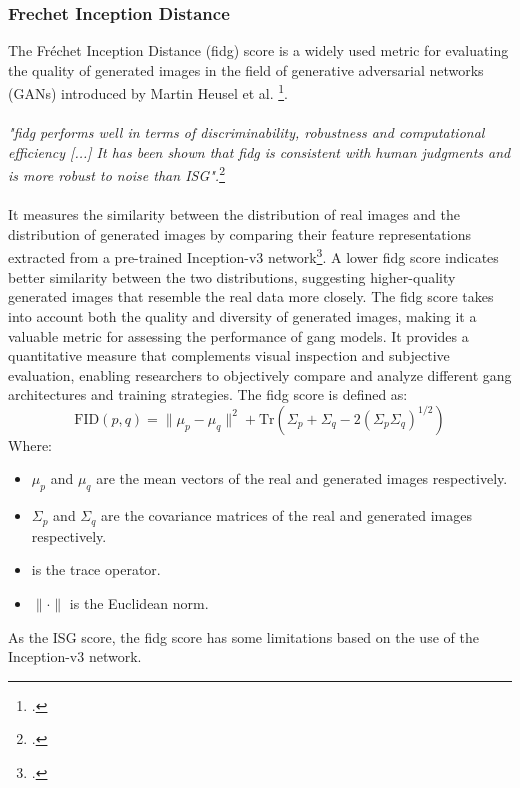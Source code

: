 \subsubsection{Frechet Inception Distance}
\label{subsubsec:frechet-inception-distance}
The Fréchet Inception Distance (\gls{fidg}\glsfirstoccur) score is a widely used metric for evaluating the quality of generated images in the field of generative adversarial networks (GANs) introduced by Martin Heusel et al. \footcite{paper:heusel2017gans}. 
\\\\
\emph{"\gls{fidg} performs well in terms of discriminability, robustness and computational efficiency [...] It has been shown that \gls{fidg} is consistent with human judgments and is more robust to noise than \gls{ISG}".}\footcite{paper:ganeval}\\\\
It measures the similarity between the distribution of real images and the distribution of generated images by comparing their feature representations extracted from a pre-trained Inception-v3 network\footcite{paper:inceptionv3}. 
A lower \gls{fidg} score indicates better similarity between the two distributions, suggesting higher-quality generated images that resemble the real data more closely. 
The \gls{fidg} score takes into account both the quality and diversity of generated images, making it a valuable metric for assessing the performance of \gls{gang} models. 
It provides a quantitative measure that complements visual inspection and subjective evaluation, enabling researchers to objectively compare and analyze different \gls{gang} architectures and training strategies.
The \gls{fidg} score is defined as:
\begin{equation}
    \label{eq:fid-score}
    \text{FID}(p, q) = \|\mu_p - \mu_q\|^2 + \text{Tr}(\Sigma_p + \Sigma_q - 2(\Sigma_p\Sigma_q)^{1/2})
\end{equation}
Where:
\begin{itemize}
    \item $\mu_p$ and $\mu_q$ are the mean vectors of the real and generated images respectively.
    \item $\Sigma_p$ and $\Sigma_q$ are the covariance matrices of the real and generated images respectively.
    \item {} is the trace operator.
    \item $\|\cdot\|$ is the Euclidean norm.
\end{itemize}
As the \gls{ISG} score, the \gls{fidg} score has some limitations based on the use of the Inception-v3 network.
